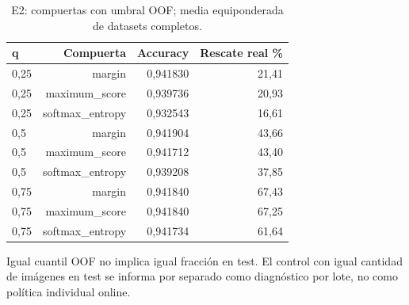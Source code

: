 \begin{table}[!htbp]\centering
\fontsize{8}{10}\selectfont\setlength{\tabcolsep}{4pt}
\caption{E2: compuertas con umbral OOF; media equiponderada de datasets completos.}\label{tab:e2-confidence}
\begin{tabular}{@{}lrrr@{}}\toprule
q & Compuerta & Accuracy & Rescate real \%\\\midrule
0,25 & margin & 0,941830 & 21,41\\
0,25 & maximum\_score & 0,939736 & 20,93\\
0,25 & softmax\_entropy & 0,932543 & 16,61\\
0,5 & margin & 0,941904 & 43,66\\
0,5 & maximum\_score & 0,941712 & 43,40\\
0,5 & softmax\_entropy & 0,939208 & 37,85\\
0,75 & margin & 0,941840 & 67,43\\
0,75 & maximum\_score & 0,941840 & 67,25\\
0,75 & softmax\_entropy & 0,941734 & 61,64\\
\bottomrule\end{tabular}
\par\smallskip\begin{minipage}{0.98\textwidth}\footnotesize Igual cuantil OOF no implica igual fracción en test. El control con igual cantidad de imágenes en test se informa por separado como diagnóstico por lote, no como política individual online.\end{minipage}
\end{table}
